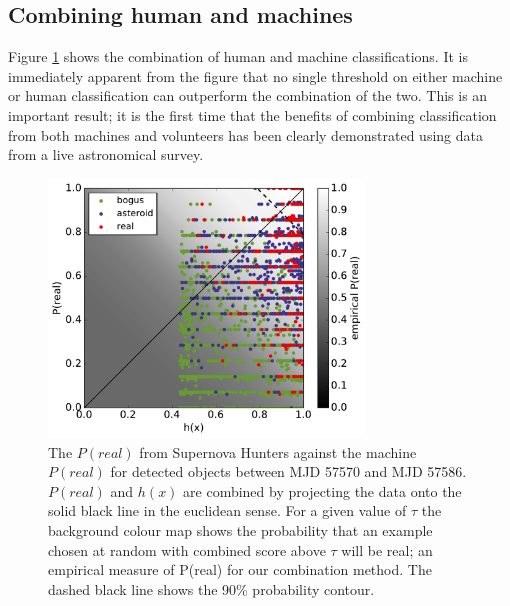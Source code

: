 \message{ !name(blank.tex)}\documentclass[a4paper,fleqn,usenatbib]{mnras}
\begin{document}
\subsection{Combining human and machines} 

Figure \ref{fig:combo_train} shows the combination of human and machine classifications. It is immediately apparent from the figure that no single threshold on either machine or human classification can outperform the combination of the two. This is an important result; it is the first time that the benefits of combining classification from both machines and volunteers has been clearly demonstrated using data from a live astronomical survey. 

\begin{figure}
   \includegraphics[width=84mm]{figs/human_v_machine_20160712-20160718.pdf}
   \caption{The $P(real)$ from Supernova Hunters against the machine $P(real)$ for detected 
            objects between MJD 57570 and MJD 57586.  $P(real)$ and $h(x)$ are combined by projecting the data onto 
             the solid black line in the euclidean sense.  For a given value of $\tau$ the background colour map
            shows the probability that an example chosen at random with combined score above $\tau$ will be real; an
            empirical measure of P(real) for our combination method.  The dashed black line shows the 90\% probability contour.}
   \label{fig:combo_train} 
\end{figure}


\end{document}
